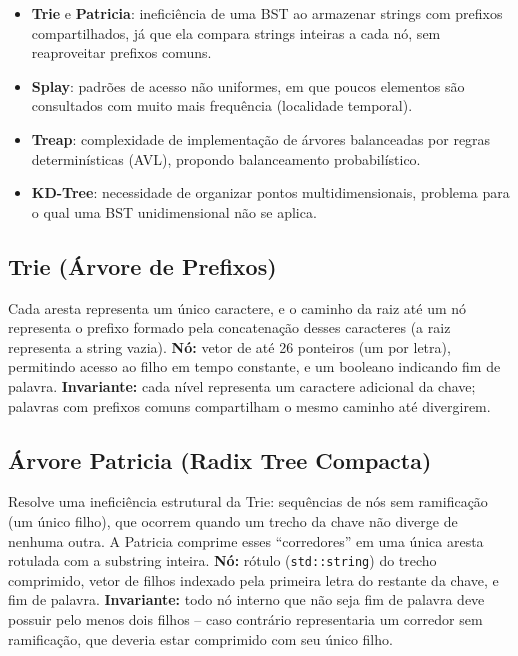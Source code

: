 \documentclass[11pt]{article}
\begin{document}
\begin{itemize}
    \item \textbf{Trie} e \textbf{Patricia}: ineficiência de uma BST ao
    armazenar strings com prefixos compartilhados, já que ela compara strings
    inteiras a cada nó, sem reaproveitar prefixos comuns.
    \item \textbf{Splay}: padrões de acesso não uniformes, em que poucos
    elementos são consultados com muito mais frequência (localidade temporal).
    \item \textbf{Treap}: complexidade de implementação de árvores balanceadas
    por regras determinísticas (AVL), propondo balanceamento probabilístico.
    \item \textbf{KD-Tree}: necessidade de organizar pontos multidimensionais,
    problema para o qual uma BST unidimensional não se aplica.
\end{itemize}

\subsection{Trie (Árvore de Prefixos)}

Cada aresta representa um único caractere, e o caminho da raiz até um nó
representa o prefixo formado pela concatenação desses caracteres (a raiz
representa a string vazia).
\textbf{Nó:} vetor de até 26 ponteiros (um por letra), permitindo acesso ao
filho em tempo constante, e um booleano indicando fim de palavra.
\textbf{Invariante:} cada nível representa um caractere adicional da chave;
palavras com prefixos comuns compartilham o mesmo caminho até divergirem.

\subsection{Árvore Patricia (Radix Tree Compacta)}

Resolve uma ineficiência estrutural da Trie: sequências de nós sem ramificação
(um único filho), que ocorrem quando um trecho da chave não diverge de nenhuma
outra. A Patricia comprime esses ``corredores'' em uma única aresta rotulada
com a substring inteira.
\textbf{Nó:} rótulo (\texttt{std::string}) do trecho comprimido, vetor de
filhos indexado pela primeira letra do restante da chave, e fim de palavra.
\textbf{Invariante:} todo nó interno que não seja fim de palavra deve possuir
pelo menos dois filhos -- caso contrário representaria um corredor sem
ramificação, que deveria estar comprimido com seu único filho.
\end{document}
